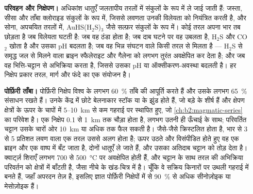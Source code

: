 \textbf{परिवहन और निक्षेपण।} अधिकांश धातुएँ जलतापीय तरलों में संकुलों के रूप में ले जाई जाती हैं: जस्ता,
सीसा और ताँबा क्लोराइड संकुलों के रूप में, जिससे लवणता उनकी विलेयता को नियंत्रित करती है, और सोना,
अपचयित तरलों में, AuHS(H$_2$S)$_3$ जैसे सल्फ़र संकुलों के रूप में। कोई तरल अपना भार तब छोड़ता है जब
विलेयता घटती है: जब वह ठंडा होता है; जब दाब घटने पर वह उबलता है, H$_2$S और CO$_2$ खोता है और उसका pH
बदलता है; जब वह भिन्न संघटन वाले किसी तरल से मिलता है --- H$_2$S से समृद्ध जल से मिलने वाला ब्राइन
स्फैलेराइट और गैलेना को लगभग तुरंत अवक्षेपित कर देता है; और जब वह भित्ति-चट्टान से अभिक्रिया करता है,
जिससे उसका pH या ऑक्सीकरण-अवस्था बदलती है। हर निक्षेप प्रकार तरल, मार्ग और फंदे का
एक संयोजन है।

\textbf{पोर्फ़िरी ताँबा।} पोर्फ़िरी निक्षेप विश्व के लगभग \qty{60}{\percent} ताँबे की आपूर्ति करते हैं और
उसके लगभग \qty{65}{\percent} संसाधन रखते हैं। उनके केंद्र में छोटे बेलनाकार स्टॉक या  के झुंड
होते हैं, जो बड़े  के शीर्ष हैं और क्षेपण क्षेत्रों के ऊपर के चापों में 5--\qty{10}{km} से कम
गहराई पर स्थापित हुए, जो \cref{ch:b2:magmatic-series} का परिवेश है। एक निक्षेप 0.1 से
\qty{1}{km} तक चौड़ा होता है, लगभग उतनी ही ऊँचाई के साथ; परिवर्तित चट्टान उसके चारों ओर \qty{10}{km}
या अधिक तक फैल सकती है। जैसे-जैसे  क्रिस्टलित होता है, भार से 3 से 5 प्रतिशत लवण वाला एक तरल
उससे अलग होता है; ऊपर उठते और विसंपीडित होते हुए वह एक ब्राइन और एक वाष्प में बँट जाता है, दोनों धातुएँ
ले जाते हैं, और उसका अतिदाब चट्टान को तोड़ देता है। क्वार्ट्ज़ शिराएँ लगभग 700 से \qty{500}{\celsius} पर
अवक्षेपित होती हैं, और चट्टान के साथ तरल की अभिक्रिया परिवर्तन को क्षेत्रों में बाँटती है, जैसा नीचे के
खंड-चित्र में है। चूँकि वे सक्रिय किनारों पर उथली गहराई में बनते हैं, जहाँ अपरदन तेज़ है, इसलिए ज्ञात
पोर्फ़िरी निक्षेपों में से \qty{90}{\percent} से अधिक सीनोज़ोइक या मेसोज़ोइक हैं।

